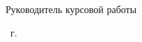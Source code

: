 \begin{titlepage}
\begin{center}
\begin{flushleft}
            \vspace{1.0cm}

            {Руководитель курсовой работы} \hfill

            \vspace{1.0cm}
        \end{flushleft}

        \the\year\ г.

    \end{center}
\end{titlepage}

